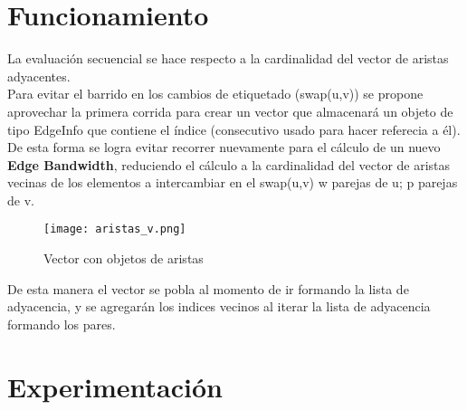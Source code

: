 \documentclass[
	letterpaper, %
	10pt, %
]{CSUniSchoolLabReport}
\begin{document}
\section{Funcionamiento}

La evaluación secuencial se hace respecto a la cardinalidad del vector de aristas adyacentes.\\

Para evitar el barrido en los cambios de etiquetado (swap(u,v)) se propone aprovechar la primera corrida para crear un vector que almacenará un objeto de tipo EdgeInfo que contiene el índice (consecutivo usado para hacer referecia a él). De esta forma se logra evitar recorrer nuevamente para el cálculo de un nuevo \textbf{Edge Bandwidth}, reduciendo el cálculo a la cardinalidad del vector de aristas vecinas de los elementos a intercambiar en el swap(u,v) w parejas de u; p parejas de v.

\begin{figure}[H] %
	\centering %
	\texttt{[image: aristas\_v.png]} %
	\caption{Vector con objetos de aristas}
\end{figure}

De esta manera el vector se pobla al momento de ir formando la lista de adyacencia, y se agregarán los indices vecinos al iterar la lista de adyacencia formando los pares.

\newpage
\section{Experimentación}
\end{document}
